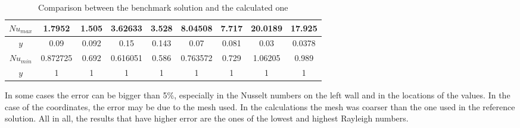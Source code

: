 \begin{table}[h]
\begin{tabular}{c|c|c|c|c|c|c|c|c|}
		\multicolumn{1}{|c|}{$Nu_{max}$} & 1.7952                    & 1.505                & 3.62633                   & 3.528                & 8.04508                   & 7.717                & 20.0189                   & 17.925               \\ \hline
		\multicolumn{1}{|c|}{$y$}     & 0.09                      & 0.092                & 0.15                      & 0.143                & 0.07                      & 0.081                & 0.03                      & 0.0378               \\ \hline
		\multicolumn{1}{|c|}{$Nu_{min}$} & 0.872725                  & 0.692                & 0.616051                  & 0.586                & 0.763572                  & 0.729                & 1.06205                   & 0.989                \\ \hline
		\multicolumn{1}{|c|}{$y$}     & 1                         & 1                    & 1                         & 1                    & 1                         & 1                    & 1                         & 1                    \\ \hline
	\end{tabular}
\caption[Comparison between the benchmark solution and the calculated one]{Comparison between the benchmark solution and the calculated one \cite{DeVahlDavis1983}}
\label{ComparisonDiffHeated}
\end{table}

In some cases the error can be bigger than 5\%, especially in the Nusselt numbers on the left wall and in the locations of the values. In the case of the coordinates, the error may be due to the mesh used. In the calculations the mesh was coarser than the one used in the reference solution. All in all, the results that have higher error are the ones of the lowest and highest Rayleigh numbers.

